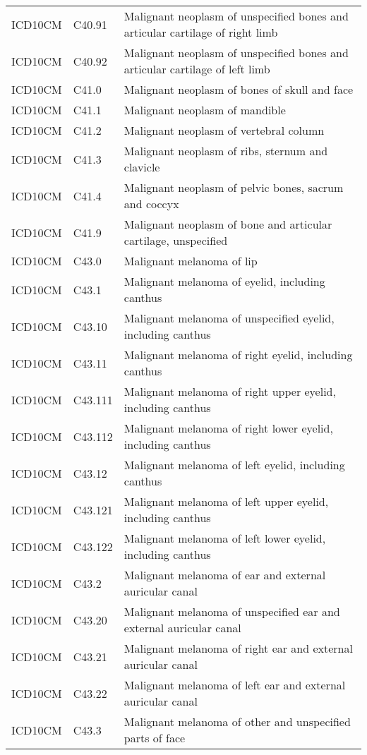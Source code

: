 \begin{table}[ht]
\begin{tabular}{lll}
  ICD10CM & C40.91 & Malignant neoplasm of unspecified bones and articular cartilage of right limb \\ 
  ICD10CM & C40.92 & Malignant neoplasm of unspecified bones and articular cartilage of left limb \\ 
  ICD10CM & C41.0 & Malignant neoplasm of bones of skull and face \\ 
  ICD10CM & C41.1 & Malignant neoplasm of mandible \\ 
  ICD10CM & C41.2 & Malignant neoplasm of vertebral column \\ 
  ICD10CM & C41.3 & Malignant neoplasm of ribs, sternum and clavicle \\ 
  ICD10CM & C41.4 & Malignant neoplasm of pelvic bones, sacrum and coccyx \\ 
  ICD10CM & C41.9 & Malignant neoplasm of bone and articular cartilage, unspecified \\ 
  ICD10CM & C43.0 & Malignant melanoma of lip \\ 
  ICD10CM & C43.1 & Malignant melanoma of eyelid, including canthus \\ 
  ICD10CM & C43.10 & Malignant melanoma of unspecified eyelid, including canthus \\ 
  ICD10CM & C43.11 & Malignant melanoma of right eyelid, including canthus \\ 
  ICD10CM & C43.111 & Malignant melanoma of right upper eyelid, including canthus \\ 
  ICD10CM & C43.112 & Malignant melanoma of right lower eyelid, including canthus \\ 
  ICD10CM & C43.12 & Malignant melanoma of left eyelid, including canthus \\ 
  ICD10CM & C43.121 & Malignant melanoma of left upper eyelid, including canthus \\ 
  ICD10CM & C43.122 & Malignant melanoma of left lower eyelid, including canthus \\ 
  ICD10CM & C43.2 & Malignant melanoma of ear and external auricular canal \\ 
  ICD10CM & C43.20 & Malignant melanoma of unspecified ear and external auricular canal \\ 
  ICD10CM & C43.21 & Malignant melanoma of right ear and external auricular canal \\ 
  ICD10CM & C43.22 & Malignant melanoma of left ear and external auricular canal \\ 
  ICD10CM & C43.3 & Malignant melanoma of other and unspecified parts of face \\ 

\end{tabular}
\end{table}
